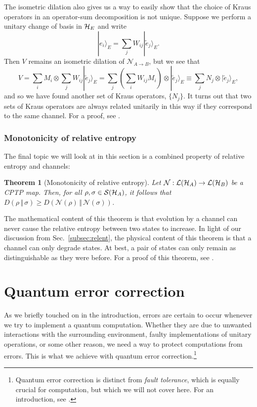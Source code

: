\documentclass[a4paper,11pt]{article}
\newtheorem{thm}{Theorem}[section]
\newcommand{\Sec}[1]{Sec.~\ref{#1}}
\newcommand{\ket}[1]{|#1\rangle}
\newcommand{\rent}[2]{D( #1 \, \Vert \, #2 )}
\newcommand{\Hil}{{\cal H}}
\begin{document}
The isometric dilation also gives us a way to easily show that the choice of Kraus operators in an operator-sum decomposition is not unique.
Suppose we perform a unitary change of basis in $\Hil_E$ and write
\begin{equation}
\ket{e_i}_E = \sum_j W_{ij} \ket{\tilde e_j}_E.
\end{equation}
Then $V$ remains an isometric dilation of $\mathcal{N}_{A \rightarrow B}$, but we see that
\begin{equation}
V = \sum_{i} M_i \otimes \sum_j W_{ij} \ket{\tilde e_j}_E = \sum_j \left(\sum_i W_{ij} M_i \right) \otimes \ket{\tilde e_j}_E \equiv \sum_j N_j \otimes \ket{\tilde e_j}_E,
\end{equation}
and so we have found another set of Kraus operators, $\{ N_j \}$.
It turns out that two sets of Kraus operators are always related unitarily in this way if they correspond to the same channel.
For a proof, see \cite{preskill}.


\subsubsection{Monotonicity of relative entropy}

The final topic we will look at in this section is a combined property of relative entropy and channels:

\begin{thm}[Monotonicity of relative entropy] \label{thm:Dmono}
Let $\mathcal{N} : \mathcal{L}(\Hil_A) \rightarrow \mathcal{L}(\Hil_B)$ be a CPTP map.
Then, for all $\rho, \sigma \in \mathcal{S}(\Hil_A)$, it follows that $\rent{\rho}{\sigma} \geq \rent{\mathcal{N}(\rho)}{\mathcal{N}(\sigma)}$.
\end{thm}

The mathematical content of this theorem is that evolution by a channel can never cause the relative entropy between two states to increase.
In light of our discussion from \Sec{subsec:relent}, the physical content of this theorem is that a channel can only degrade states.
At best, a pair of states can only remain as distinguishable as they were before.
For a proof of this theorem, see \cite[Thm.~11.8.1]{Wilde:2011npi}.



\section{Quantum error correction}
\label{sec:QEC}

As we briefly touched on in the introduction, errors are certain to occur whenever we try to implement a quantum computation.
Whether they are due to unwanted interactions with the surrounding environment, faulty implementations of unitary operations, or some other reason, we need a way to protect computations from errors.
This is what we achieve with quantum error correction.\footnote{Quantum error correction is distinct from \emph{fault tolerance}, which is equally crucial for computation, but which we will not cover here. For an introduction, see \cite{Devitt_2013}.}
\end{document}
